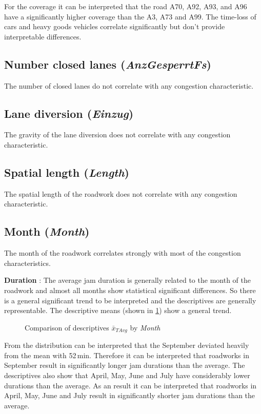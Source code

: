 For the coverage it can be interpreted that the road A70, A92, A93, and A96 have a significantly higher coverage than the A3, A73 and A99. The time-loss of cars and heavy goods vehicles correlate significantly but don't provide interpretable differences.

\subsection{Number closed lanes (\textit{AnzGesperrtFs})}
The number of closed lanes do not correlate with any congestion characteristic.

\subsection{Lane diversion (\textit{Einzug})}
The gravity of the lane diversion does not correlate with any congestion characteristic.

\subsection{Spatial length (\textit{Length})}
The spatial length of the roadwork does not correlate with any congestion characteristic. 

\subsection{Month (\textit{Month})}
The month of the roadwork correlates strongly with most of the congestion characteristics. 

\textbf{Duration} : The average jam duration is generally related to the month of the roadwork and almost all months show statistical significant differences. So there is a general significant trend to be interpreted and the descriptives are generally representable. The descriptive means (shown in \cref{fig:arbis_summary_month_duration}) show a general trend.
\begin{figure}[ht!]
	\data
	\pgfplotstablesort[sort key=gMeanSAvg, sort cmp=float >]{\datasorted}{\data}
	\tiny
	\centering
	\caption{Comparison of descriptives $\bar{x}_{TAvg}$ by \textit{Month}}
	\label{fig:arbis_summary_month_duration}
\end{figure}
From the distribution can be interpreted that the September deviated heavily from the mean with 52\,min. Therefore it can be interpreted that roadworks in September result in significantly longer jam durations than the average. The descriptives also show that April, May, June and July have considerably lower durations than the average. As an result it can be interpreted that roadworks in April, May, June and July result in significantly shorter jam durations than the average. 

